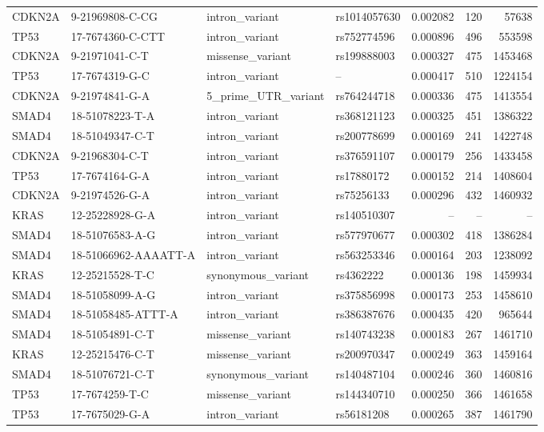 \begin{footnotesize}
\begin{longtable}{llllrrr}
CDKN2A & 9-21969808-C-CG & intron\_variant & rs1014057630 & 0.002082 & 120 & 57638 \\
TP53 & 17-7674360-C-CTT & intron\_variant & rs752774596 & 0.000896 & 496 & 553598 \\
CDKN2A & 9-21971041-C-T & missense\_variant & rs199888003 & 0.000327 & 475 & 1453468 \\
TP53 & 17-7674319-G-C & intron\_variant & -- & 0.000417 & 510 & 1224154 \\
CDKN2A & 9-21974841-G-A & 5\_prime\_UTR\_variant & rs764244718 & 0.000336 & 475 & 1413554 \\
SMAD4 & 18-51078223-T-A & intron\_variant & rs368121123 & 0.000325 & 451 & 1386322 \\
SMAD4 & 18-51049347-C-T & intron\_variant & rs200778699 & 0.000169 & 241 & 1422748 \\
CDKN2A & 9-21968304-C-T & intron\_variant & rs376591107 & 0.000179 & 256 & 1433458 \\
TP53 & 17-7674164-G-A & intron\_variant & rs17880172 & 0.000152 & 214 & 1408604 \\
CDKN2A & 9-21974526-G-A & intron\_variant & rs75256133 & 0.000296 & 432 & 1460932 \\
KRAS & 12-25228928-G-A & intron\_variant & rs140510307 & -- & -- & -- \\
SMAD4 & 18-51076583-A-G & intron\_variant & rs577970677 & 0.000302 & 418 & 1386284 \\
SMAD4 & 18-51066962-AAAATT-A & intron\_variant & rs563253346 & 0.000164 & 203 & 1238092 \\
KRAS & 12-25215528-T-C & synonymous\_variant & rs4362222 & 0.000136 & 198 & 1459934 \\
SMAD4 & 18-51058099-A-G & intron\_variant & rs375856998 & 0.000173 & 253 & 1458610 \\
SMAD4 & 18-51058485-ATTT-A & intron\_variant & rs386387676 & 0.000435 & 420 & 965644 \\
SMAD4 & 18-51054891-C-T & missense\_variant & rs140743238 & 0.000183 & 267 & 1461710 \\
KRAS & 12-25215476-C-T & missense\_variant & rs200970347 & 0.000249 & 363 & 1459164 \\
SMAD4 & 18-51076721-C-T & synonymous\_variant & rs140487104 & 0.000246 & 360 & 1460816 \\
TP53 & 17-7674259-T-C & missense\_variant & rs144340710 & 0.000250 & 366 & 1461658 \\
TP53 & 17-7675029-G-A & intron\_variant & rs56181208 & 0.000265 & 387 & 1461790 \\

\end{longtable}
\end{footnotesize}
